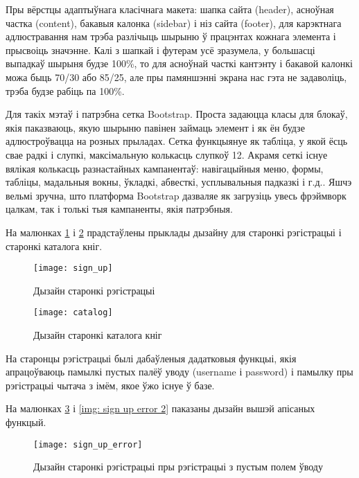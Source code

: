 Пры вёрстцы адаптыўнага класічнага макета: шапка сайта (header), асноўная частка (content), бакавыя калонка (sidebar) і ніз сайта (footer), для карэктнага адлюстравання нам трэба разлічыць шырыню ў працэнтах кожнага элемента і прысвоіць значэнне. Калі з шапкай і футерам усё зразумела, у большасці выпадкаў шырыня будзе 100\%, то для асноўнай часткі кантэнту і бакавой калонкі можа быць 70/30 або 85/25, але пры памяншэнні экрана нас гэта не задаволіць, трэба будзе рабіць па 100\%.

Для такіх мэтаў і патрэбна сетка Bootstrap. Проста задаюцца класы для блокаў, якія паказваюць, якую шырыню павінен займаць элемент і як ён будзе адлюстроўвацца на розных прыладах. Сетка функцыянуе як табліца, у якой ёсць свае радкі і слупкі, максімальную колькасць слупкоў 12.
Акрамя сеткі існуе вялікая колькасць разнастайных кампанентаў: навігацыйныя меню, формы, табліцы, мадальныя вокны, ўкладкі, абвесткі, усплывальныя падказкі і г.д..
Яшчэ вельмі зручна, што платформа Bootstrap дазваляе як загрузіць увесь фрэймворк цалкам, так і толькі тыя кампаненты, якія патрэбныя.

На малюнках \ref{img: sign up sample} і \ref{img: catalog sample} прадстаўлены прыклады дызайну для старонкі
рэгістрацыі і старонкі каталога кніг.

\begin{figure}[h!]
    \centering
    \texttt{[image: sign\_up]}
    \caption{Дызайн старонкі рэгістрацыі}
    \label{img: sign up sample} 
\end{figure}

\begin{figure}[h!]
    \centering
    \texttt{[image: catalog]}
    \caption{Дызайн старонкі каталога кніг}
    \label{img: catalog sample} 
\end{figure}

На старонцы рэгістрацыі былі дабаўленыя дадатковыя функцыі, якія апрацоўваюць памылкі пустых палёў уводу
(username і password) і памылку пры рэгістрацыі чытача з імём, якое ўжо існуе ў базе.

На малюнках \ref{img: sign up error} і \ref{img: sign up error 2} паказаны дызайн вышэй апісаных функцый.

\begin{figure}[h!]
    \centering
    \texttt{[image: sign\_up\_error]}
    \caption{Дызайн старонкі рэгістрацыі пры рэгістрацыі з пустым полем ўводу}
    \label{img: sign up error} 
\end{figure}


